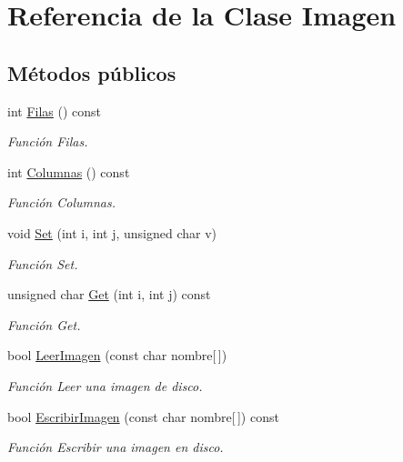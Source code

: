 \hypertarget{class_imagen}{\section{Referencia de la Clase Imagen}
\label{class_imagen}
}
\subsection*{Métodos públicos}
\begin{DoxyCompactItemize}
\item 
int \hyperlink{class_imagen_a4cc181b097a76bc3204161d98cfb5fa6}{Filas} () const 
\begin{DoxyCompactList}\small\item\em Función Filas. \end{DoxyCompactList}\item 
int \hyperlink{class_imagen_aa7fb553d54e0d1ad019b61d65ee11935}{Columnas} () const 
\begin{DoxyCompactList}\small\item\em Función Columnas. \end{DoxyCompactList}\item 
void \hyperlink{class_imagen_a483a65938e025af27c8a8e30bd0d595d}{Set} (int i, int j, unsigned char v)
\begin{DoxyCompactList}\small\item\em Función Set. \end{DoxyCompactList}\item 
unsigned char \hyperlink{class_imagen_afbfd81bbf28620cc319f2423b202f1da}{Get} (int i, int j) const 
\begin{DoxyCompactList}\small\item\em Función Get. \end{DoxyCompactList}\item 
bool \hyperlink{class_imagen_ad6ec2b90fc9213cc429cbedc60a7dbfc}{Leer\+Imagen} (const char nombre\mbox{[}$\,$\mbox{]})
\begin{DoxyCompactList}\small\item\em Función Leer una imagen de disco. \end{DoxyCompactList}\item 
bool \hyperlink{class_imagen_a1c5244502b596289c19eec4c7e8d4c5b}{Escribir\+Imagen} (const char nombre\mbox{[}$\,$\mbox{]}) const 
\begin{DoxyCompactList}\small\item\em Función Escribir una imagen en disco. \end{DoxyCompactList}\item 

\end{DoxyCompactItemize}
